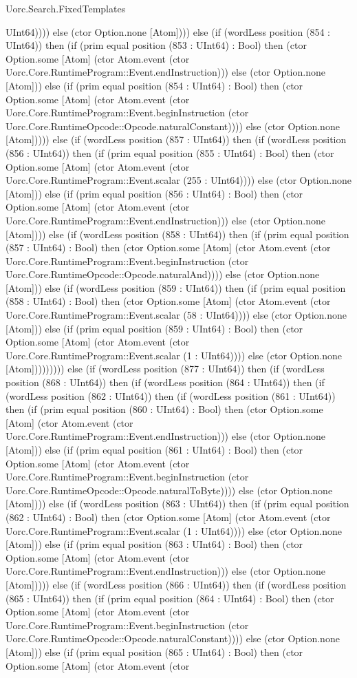 \begin{lexlean}{Uorc.Search.FixedTemplates}
\begin{semanticmodule}
{UInt64)))) else (ctor Option.none [Atom]))) else (if (wordLess position (854 : UInt64)) then (if (prim equal position (853 : UInt64) : Bool) then (ctor Option.some [Atom] (ctor Atom.event (ctor Uorc.Core.RuntimeProgram::Event.endInstruction))) else (ctor Option.none [Atom])) else (if (prim equal position (854 : UInt64) : Bool) then (ctor Option.some [Atom] (ctor Atom.event (ctor Uorc.Core.RuntimeProgram::Event.beginInstruction (ctor Uorc.Core.RuntimeOpcode::Opcode.naturalConstant)))) else (ctor Option.none [Atom])))) else (if (wordLess position (857 : UInt64)) then (if (wordLess position (856 : UInt64)) then (if (prim equal position (855 : UInt64) : Bool) then (ctor Option.some [Atom] (ctor Atom.event (ctor Uorc.Core.RuntimeProgram::Event.scalar (255 : UInt64)))) else (ctor Option.none [Atom])) else (if (prim equal position (856 : UInt64) : Bool) then (ctor Option.some [Atom] (ctor Atom.event (ctor Uorc.Core.RuntimeProgram::Event.endInstruction))) else (ctor Option.none [Atom]))) else (if (wordLess position (858 : UInt64)) then (if (prim equal position (857 : UInt64) : Bool) then (ctor Option.some [Atom] (ctor Atom.event (ctor Uorc.Core.RuntimeProgram::Event.beginInstruction (ctor Uorc.Core.RuntimeOpcode::Opcode.naturalAnd)))) else (ctor Option.none [Atom])) else (if (wordLess position (859 : UInt64)) then (if (prim equal position (858 : UInt64) : Bool) then (ctor Option.some [Atom] (ctor Atom.event (ctor Uorc.Core.RuntimeProgram::Event.scalar (58 : UInt64)))) else (ctor Option.none [Atom])) else (if (prim equal position (859 : UInt64) : Bool) then (ctor Option.some [Atom] (ctor Atom.event (ctor Uorc.Core.RuntimeProgram::Event.scalar (1 : UInt64)))) else (ctor Option.none [Atom])))))))) else (if (wordLess position (877 : UInt64)) then (if (wordLess position (868 : UInt64)) then (if (wordLess position (864 : UInt64)) then (if (wordLess position (862 : UInt64)) then (if (wordLess position (861 : UInt64)) then (if (prim equal position (860 : UInt64) : Bool) then (ctor Option.some [Atom] (ctor Atom.event (ctor Uorc.Core.RuntimeProgram::Event.endInstruction))) else (ctor Option.none [Atom])) else (if (prim equal position (861 : UInt64) : Bool) then (ctor Option.some [Atom] (ctor Atom.event (ctor Uorc.Core.RuntimeProgram::Event.beginInstruction (ctor Uorc.Core.RuntimeOpcode::Opcode.naturalToByte)))) else (ctor Option.none [Atom]))) else (if (wordLess position (863 : UInt64)) then (if (prim equal position (862 : UInt64) : Bool) then (ctor Option.some [Atom] (ctor Atom.event (ctor Uorc.Core.RuntimeProgram::Event.scalar (1 : UInt64)))) else (ctor Option.none [Atom])) else (if (prim equal position (863 : UInt64) : Bool) then (ctor Option.some [Atom] (ctor Atom.event (ctor Uorc.Core.RuntimeProgram::Event.endInstruction))) else (ctor Option.none [Atom])))) else (if (wordLess position (866 : UInt64)) then (if (wordLess position (865 : UInt64)) then (if (prim equal position (864 : UInt64) : Bool) then (ctor Option.some [Atom] (ctor Atom.event (ctor Uorc.Core.RuntimeProgram::Event.beginInstruction (ctor Uorc.Core.RuntimeOpcode::Opcode.naturalConstant)))) else (ctor Option.none [Atom])) else (if (prim equal position (865 : UInt64) : Bool) then (ctor Option.some [Atom] (ctor Atom.event (ctor }
\end{semanticmodule}
\end{lexlean}
